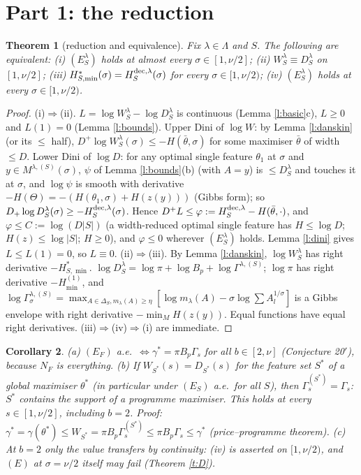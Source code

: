 \documentclass[11pt]{article}
\newtheorem{theorem}{Theorem}\newtheorem{lemma}[theorem]{Lemma}\newtheorem{proposition}[theorem]{Proposition}
\newtheorem{corollary}[theorem]{Corollary}
\theoremstyle{remark}\newtheorem{remark}[theorem]{Remark}
\begin{document}
\section{Part 1: the reduction}
\begin{theorem}[reduction and equivalence]\label{t:A}
Fix $\lambda\in\Lambda$ and $S$. The following are equivalent:
(i) $(E^\lambda_S)$ holds at almost every $\sigma\in[1,\nu/2]$;
(ii) $W^\lambda_S\equiv D^\lambda_S$ on $[1,\nu/2]$;
(iii) $H^*_{S,\min}(\sigma)=H^{\rm dec,\lambda}_S(\sigma)$ for every $\sigma\in[1,\nu/2)$;
(iv) $(E^\lambda_S)$ holds at every $\sigma\in[1,\nu/2)$.
\end{theorem}
\begin{proof}
(i)$\Rightarrow$(ii). $L=\log W^\lambda_S-\log D^\lambda_S$ is continuous (Lemma \ref{l:basic}c), $L\ge0$ and $L(1)=0$
(Lemma \ref{l:bounds}). Upper Dini of $\log W$: by Lemma \ref{l:danskin} (or its $\le$ half),
$D^+\log W^\lambda_S(\sigma)\le-H(\bar\theta,\sigma)$ for some maximiser $\bar\theta$ of width $\le D$.
Lower Dini of $\log D$: for any optimal single feature $\theta_1$ at $\sigma$ and $y\in M^{\lambda,(S)}(\sigma)$,
$\psi$ of Lemma \ref{l:bounds}(b) (with $A=y$) is $\le D^\lambda_S$ and touches it at $\sigma$, and
$\log\psi$ is smooth with derivative $-H(\Theta)=-(H(\theta_1,\sigma)+H(z(y)))$ (Gibbs form); so
$D_+\log D^\lambda_S(\sigma)\ge-H^{\rm dec,\lambda}_S(\sigma)$. Hence $D^+L\le\varphi:=H^{\rm dec,\lambda}_S-H(\bar\theta,\cdot)$, and
$\varphi\le C:=\log(D|S|)$ (a width-reduced optimal single feature has $H\le\log D$; $H(z)\le\log|S|$; $H\ge0$), and
$\varphi\le0$ wherever $(E^\lambda_S)$ holds. Lemma \ref{l:dini} gives $L\le L(1)=0$, so $L\equiv0$.
(ii)$\Rightarrow$(iii). By Lemma \ref{l:danskin}, $\log W^\lambda_S$ has right derivative $-H^*_{S,\min}$.
$\log D^\lambda_S=\log\pi+\log B_p+\log\Gamma^{\lambda,(S)}$; $\log\pi$ has right derivative $-H^{(1)}_{\min}$, and
$\log\Gamma^{\lambda,(S)}_\sigma=\max_{A\in\Delta_S,m_\lambda(A)\ge\eta}[\log m_\lambda(A)-\sigma\log\sum A_l^{1/\sigma}]$ is a Gibbs envelope
with right derivative $-\min_{M}H(z(y))$. Equal functions have equal right derivatives.
(iii)$\Rightarrow$(iv)$\Rightarrow$(i) are immediate.
\end{proof}
\begin{corollary}\label{c:A}
(a) $(E_F)$ a.e.\ $\iff\gamma^*=\pi B_p\Gamma_s$ for all $b\in[2,\nu]$ (Conjecture 20$'$), because $N_F$ is everything.
(b) If $W_{S^*}(s)=D_{S^*}(s)$ for the feature set $S^*$ of a global maximiser $\theta^*$ (in particular under $(E_S)$ a.e.\
for all $S$), then $\Gamma^{(S^*)}_s=\Gamma_s$: $S^*$ contains the support of a programme maximiser. This holds at every
$s\in[1,\nu/2]$, \emph{including $b=2$}. Proof: $\gamma^*=\gamma(\theta^*)\le W_{S^*}=\pi B_p\Gamma^{(S^*)}_s\le\pi B_p\Gamma_s\le\gamma^*$
(price--programme theorem).
(c) At $b=2$ only the value transfers by continuity: (iv) is asserted on $[1,\nu/2)$, and $(E)$ at $\sigma=\nu/2$ itself may fail
(Theorem \ref{t:D}).
\end{corollary}
\end{document}
